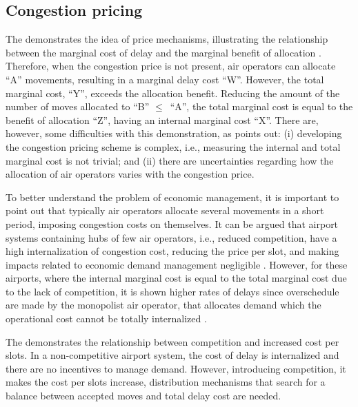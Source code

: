 \subsection{Congestion pricing}

The  demonstrates the idea of price mechanisms, illustrating the relationship between the marginal cost of delay and the marginal benefit of allocation \cite{gillen2016airport}. Therefore, when the congestion price is not present, air operators can allocate “A” movements, resulting in a marginal delay cost “W”. However, the total marginal cost, “Y”, exceeds the allocation benefit. Reducing the amount of the number of moves allocated to “B” $\le$\ “A”, the total marginal cost is equal to the benefit of allocation “Z”, having an internal marginal cost “X”. There are, however, some difficulties with this demonstration, as \cite{gillen2016airport} points out: (i) developing the congestion pricing scheme is complex, i.e., measuring the internal and total marginal cost is not trivial; and (ii) there are uncertainties regarding how the allocation of air operators varies with the congestion price.

%

To better understand the problem of economic management, it is important to point out that typically air operators allocate several movements in a short period, imposing congestion costs on themselves. It can be argued that airport systems containing hubs of few air operators, i.e., reduced competition, have a high internalization of congestion cost, reducing the price per slot, and making impacts related to economic demand management negligible \cite{ball2006auctions, gillen2016airport}. However, for these airports, where the internal marginal cost is equal to the total marginal cost due to the lack of competition, it is shown higher rates of delays since overschedule are made by the monopolist air operator, that allocates demand which the operational cost cannot be totally internalized \cite{ball2006auctions}.

The  demonstrates the relationship between competition and increased cost per slots. In a non-competitive airport system, the cost of delay is internalized and there are no incentives to manage demand. However, introducing competition, it makes the cost per slots increase, distribution mechanisms that search for a balance between accepted moves and total delay cost are needed.

